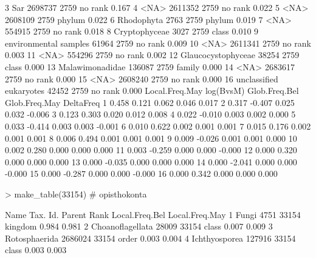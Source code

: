 \documentclass{article}
\begin{document}
\begin{Schunk}
\begin{Soutput}
3                      Sar  2698737   2759 no rank          0.167
4                     <NA>  2611352   2759 no rank          0.022
5                     <NA>  2608109   2759  phylum          0.022
6               Rhodophyta     2763   2759  phylum          0.019
7                     <NA>   554915   2759 no rank          0.018
8            Cryptophyceae     3027   2759   class          0.010
9    environmental samples    61964   2759 no rank          0.009
10                    <NA>  2611341   2759 no rank          0.003
11                    <NA>   554296   2759 no rank          0.002
12      Glaucocystophyceae    38254   2759   class          0.000
13         Malawimonadidae   136087   2759  family          0.000
14                    <NA>  2683617   2759 no rank          0.000
15                    <NA>  2608240   2759 no rank          0.000
16 unclassified eukaryotes    42452   2759 no rank          0.000
   Local.Freq.May log(BvsM) Glob.Freq.Bel Glob.Freq.May DeltaFreq
1           0.458     0.121         0.062         0.046     0.017
2           0.317    -0.407         0.025         0.032    -0.006
3           0.123     0.303         0.020         0.012     0.008
4           0.022    -0.010         0.003         0.002     0.000
5           0.033    -0.414         0.003         0.003    -0.001
6           0.010     0.622         0.002         0.001     0.001
7           0.015     0.176         0.002         0.001     0.001
8           0.006     0.494         0.001         0.001     0.001
9           0.009    -0.026         0.001         0.001     0.000
10          0.002     0.280         0.000         0.000     0.000
11          0.003    -0.259         0.000         0.000    -0.000
12          0.000     0.320         0.000         0.000     0.000
13          0.000    -0.035         0.000         0.000     0.000
14          0.000    -2.041         0.000         0.000    -0.000
15          0.000    -0.287         0.000         0.000    -0.000
16          0.000     0.342         0.000         0.000     0.000
\end{Soutput}
\begin{Sinput}
> make_table(33154) # opisthokonta
\end{Sinput}
\begin{Soutput}
              Name Tax. Id. Parent    Rank Local.Freq.Bel Local.Freq.May
1            Fungi     4751  33154 kingdom          0.984          0.981
2 Choanoflagellata    28009  33154   class          0.007          0.009
3    Rotosphaerida  2686024  33154   order          0.003          0.004
4    Ichthyosporea   127916  33154   class          0.003          0.003

\end{Soutput}
\end{Schunk}
\end{document}
